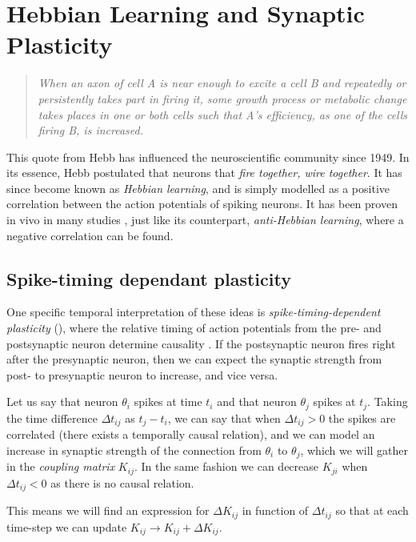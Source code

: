 \newpage
\section{Hebbian Learning and Synaptic Plasticity}
\vspace{1mm}
\begin{quote}
\textsl{When an axon of cell A is near enough to excite a cell B and repeatedly or persistently takes part in firing it, some growth process or metabolic change takes places in one or both cells such that A's efficiency, as one of the cells firing B, is increased.}\cite{Hebb1949}
\end{quote}

This quote from Hebb has influenced the neuroscientific community since 1949. In its essence, Hebb postulated that neurons that \textsl{fire together, wire together}. It has since become known as \textsl{Hebbian learning}, and is simply modelled as a positive correlation between the action potentials of spiking neurons. It has been proven in vivo in many studies \cite{ChrolCannon2014}, just like its counterpart, \textsl{anti-Hebbian learning}, where a negative correlation can be found.


\subsection{Spike-timing dependant plasticity}
One specific temporal interpretation of these ideas is \textsl{spike-timing-dependent plasticity} (\STDP), where the relative timing of action potentials from the pre- and postsynaptic neuron determine causality \cite{Kempter1999, Gerstner2002}. If the postsynaptic neuron fires right after the presynaptic neuron, then we can expect the synaptic strength from post- to presynaptic neuron to increase, and vice versa. 

Let us say that neuron $\theta_i$ spikes at time $t_i$ and that neuron $\theta_j$ spikes at $t_j$. Taking the time difference $\Delta t_{ij}$ as $t_j - t_i$, we can say that when $\Delta t_{ij} > 0$ the spikes are correlated (there exists a temporally causal relation), and we can model an increase in synaptic strength of the connection from $\theta_i$ to $\theta_j$, which we will gather in the \textsl{coupling matrix} $K_{ij}$. In the same fashion we can decrease $K_{ji}$ when $\Delta t_{ij} < 0$ as there is no causal relation. 

This means we will find an expression for $\Delta K_{ij}$ in function of $\Delta t_{ij}$ so that at each time-step we can update $K_{ij} \rightarrow K_{ij} + \Delta K_{ij}$.\\

